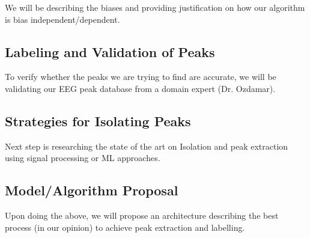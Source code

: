 \documentclass{article}
\begin{document}
	We will be describing the biases and providing justification on how our algorithm is bias independent/dependent.
	
	\subsection{Labeling and Validation of Peaks}
	
	To verify whether the peaks we are trying to find are accurate, we will be validating our EEG peak database from a domain expert (Dr. Ozdamar).
	
	\subsection{Strategies for Isolating Peaks}
	Next step is researching the state of the art on Isolation and peak extraction using signal processing or ML approaches.
	
	\subsection{Model/Algorithm Proposal}
	
	Upon doing the above, we will propose an architecture describing the best process (in our opinion) to achieve peak extraction and labelling.
	
	

		
	
	
	\newpage
	
	
	
	
	
	
\end{document}
